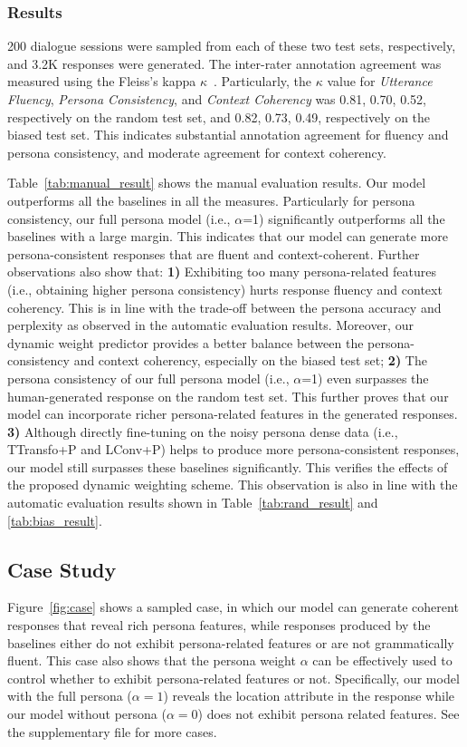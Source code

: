 \documentclass[letterpaper]{article}
\newcommand{\citep}{\cite}
\begin{document}
\subsubsection{Results}
200 dialogue sessions were sampled from each of these two test sets, respectively, and 3.2K responses were generated. The inter-rater annotation agreement was measured using the Fleiss's kappa $\kappa$~\citep{randolph2005free}. Particularly, the $\kappa$ value for \emph{Utterance Fluency}, \emph{Persona Consistency}, and \emph{Context Coherency} was 0.81, 0.70, 0.52, respectively on the random test set, and 0.82, 0.73, 0.49, respectively on the biased test set. This indicates substantial annotation agreement for fluency and persona consistency, and moderate agreement for context coherency.

Table~\ref{tab:manual_result} shows the manual evaluation results. Our model outperforms all the baselines in all the measures. Particularly for persona consistency, our full persona model (i.e., $\alpha$=1) significantly outperforms all the baselines with a large margin. This indicates that our model can generate more persona-consistent responses that are fluent and context-coherent. Further observations also show that:
\textbf{1)} Exhibiting too many persona-related features (i.e., obtaining higher persona consistency) hurts response fluency and context coherency. This is in line with the trade-off between the persona accuracy and perplexity as observed in the automatic evaluation results. Moreover, our dynamic weight predictor provides a better balance between the persona-consistency and context coherency, especially on the biased test set;
\textbf{2)} The persona consistency of our full persona model (i.e., $\alpha$=1) even surpasses the human-generated response on the random test set. This further proves that our model can incorporate richer persona-related features in the generated responses.
\textbf{3)} Although directly fine-tuning on the noisy persona dense data (i.e., TTransfo+P and LConv+P) helps to produce more persona-consistent responses, our model still surpasses these baselines significantly. This verifies the effects of the proposed dynamic weighting scheme. This observation is also in line with the automatic evaluation results shown in Table~\ref{tab:rand_result} and \ref{tab:bias_result}.

\subsection{Case Study}
Figure~\ref{fig:case} shows a sampled case, in which our model can generate coherent responses that reveal rich persona features, while responses produced by the baselines either do not exhibit persona-related features or are not grammatically fluent. This case also shows that the persona weight $\alpha$ can be effectively used to control whether to exhibit persona-related features or not. Specifically, our model with the full persona ($\alpha=1$) reveals the location attribute in the response while our model without persona ($\alpha=0$) does not exhibit persona related features. See the supplementary file for more cases.
\end{document}
